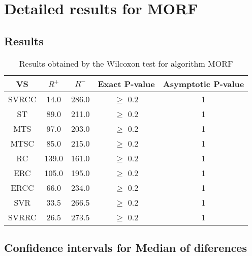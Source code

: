 \documentclass[a4paper,10pt]{article}
\begin{document}
\section{Detailed results for MORF}


\subsection{Results}

\begin{table}[!htp]
\centering\small
\begin{tabular}{
|c|c|c|c|c|}
\hline
 VS & $R^{+}$ & $R^{-}$ & Exact P-value & Asymptotic P-value \\ \hline 
SVRCC & 14.0 & 286.0 & $\geq$ 0.2 & 1\\ \hline 
ST & 89.0 & 211.0 & $\geq$ 0.2 & 1\\ \hline 
MTS & 97.0 & 203.0 & $\geq$ 0.2 & 1\\ \hline 
MTSC & 85.0 & 215.0 & $\geq$ 0.2 & 1\\ \hline 
RC & 139.0 & 161.0 & $\geq$ 0.2 & 1\\ \hline 
ERC & 105.0 & 195.0 & $\geq$ 0.2 & 1\\ \hline 
ERCC & 66.0 & 234.0 & $\geq$ 0.2 & 1\\ \hline 
SVR & 33.5 & 266.5 & $\geq$ 0.2 & 1\\ \hline 
SVRRC & 26.5 & 273.5 & $\geq$ 0.2 & 1\\ \hline 

\end{tabular}
\caption{Results obtained by the Wilcoxon test for algorithm MORF}
\end{table}

\subsection{Confidence intervals for Median of diferences}
\end{document}
